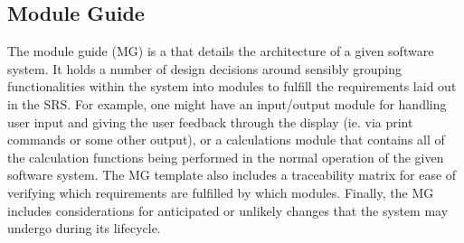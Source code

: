 

\subsection{Module Guide}
\label{sec:breakdown:mg}

The module guide (MG) is a \sf{} that details the architecture of a given 
software system. It holds a number of design decisions around sensibly grouping 
functionalities within the system into modules to fulfill the requirements laid 
out in the SRS. For example, one might have an input/output module for handling 
user input and giving the user feedback through the display (ie. via print 
commands or some other output), or a calculations module that contains all of 
the calculation functions being performed in the normal operation of the given 
software system. The \smithea{} MG template also includes a traceability matrix 
for ease of verifying which requirements are fulfilled by which modules. 
Finally, the MG includes considerations for anticipated or unlikely changes 
that the system may undergo during its lifecycle.

